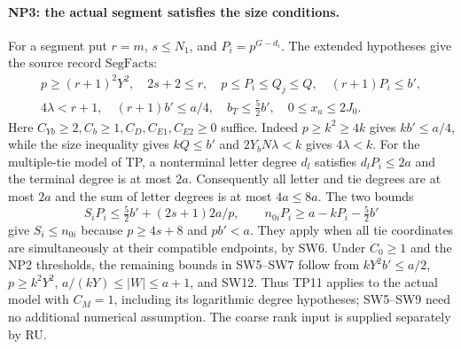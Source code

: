 \documentclass[11pt,a4paper]{article}
\numberwithin{equation}{section}
\theoremstyle{remark}\newtheorem{remark}[theorem]{Remark}
\begin{document}
\paragraph{NP3: the actual segment satisfies the size conditions.}
For a segment put $r=m$, $s\le N_1$, and $P_i=p^{G-d_i}$.
The extended hypotheses give the source record $\mathrm{SegFacts}$:
\[
 \begin{gathered}
 p\ge(r+1)^2Y^2,\quad 2s+2\le r,\quad
 p\le P_i\le Q_j\le Q,\quad (r+1)P_i\le b',\\
 4\lambda<r+1,\quad (r+1)b'\le a/4,\quad
 b_T\le\tfrac52b',\quad 0\le x_a\le2J_0.
 \end{gathered}                                      \tag{NP.4}
\]
Here $C_{Yb}\ge2,C_b\ge1,C_D,C_{E1},C_{E2}\ge0$ suffice.
Indeed $p\ge k^2\ge4k$ gives $kb'\le a/4$, while the size
inequality gives $kQ\le b'$ and $2Y_bN\lambda<k$ gives $4\lambda<k$.
For the multiple-tie model of TP, a nonterminal letter degree $d_l$
satisfies $d_lP_i\le2a$ and the terminal degree is at most $2a$.
Consequently all letter and tie degrees are at most $2a$ and the
sum of letter degrees is at most $4a\le8a$.
The two bounds
\[
 S_iP_i\le\tfrac52b'+(2s+1)2a/p,\qquad
 n_{0i}P_i\ge a-kP_i-\tfrac52b'
\]
give $S_i\le n_{0i}$ because $p\ge4s+8$ and $pb'<a$.
They apply when all tie coordinates are simultaneously at their
compatible endpoints, by SW6.
Under $C_0\ge1$ and the NP2 thresholds, the remaining bounds in
SW5--SW7 follow from $kY^2b'\le a/2$, $p\ge k^2Y^2$,
$a/(kY)\le|W|\le a+1$, and SW12.
Thus TP11 applies to the actual model with $C_M=1$, including its
logarithmic degree hypotheses; SW5--SW9 need no additional numerical
assumption. The coarse rank input is supplied separately by RU.
\end{document}
